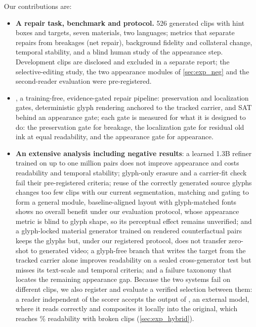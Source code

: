 Our contributions are:
\begin{itemize}
\item \textbf{A repair task, benchmark and protocol.} 526 generated clips with hint boxes and targets, seven materials, two languages; metrics that separate repairs from breakages (net repair), background fidelity and collateral change, temporal stability, and a blind human study of the appearance step. Development clips are disclosed and excluded in a separate report; the selective-editing study, the two appearance modules of \cref{sec:exp_neg} and the second-reader evaluation were pre-registered.
\item \textbf{\method}, a training-free, evidence-gated repair pipeline: preservation and localization gates, deterministic glyph rendering anchored to the tracked carrier, and SAT behind an appearance gate; each gate is measured for what it is designed to do: the preservation gate for breakage, the localization gate for residual old ink at equal readability, and the appearance gate for appearance.
\item \textbf{An extensive analysis including negative results}: a learned 1.3B refiner trained on up to one million pairs does not improve appearance and costs readability and temporal stability; glyph-only erasure and a carrier-fit check fail their pre-registered criteria; reuse of the correctly generated source glyphs changes too few clips with our current segmentation, matching and gating to form a general module, baseline-aligned layout with glyph-matched fonts shows no overall benefit under our evaluation protocol, whose appearance metric is blind to glyph shape, so its perceptual effect remains unverified; and a glyph-locked material generator trained on rendered counterfactual pairs keeps the glyphs but, under our registered protocol, does not transfer zero-shot to generated video; a glyph-free branch that writes the target from the tracked carrier alone improves readability on a sealed cross-generator test but misses its text-scale and temporal criteria; and a failure taxonomy that locates the remaining appearance gap. Because the two systems fail on different clips, we also register and evaluate a verified selection between them: a reader independent of the scorer accepts the output of \steer, an external model, where it reads correctly and composites it locally into the original, which reaches \hVRead\% readability with \hVBroken{} broken clips (\cref{sec:exp_hybrid}).
\end{itemize}
